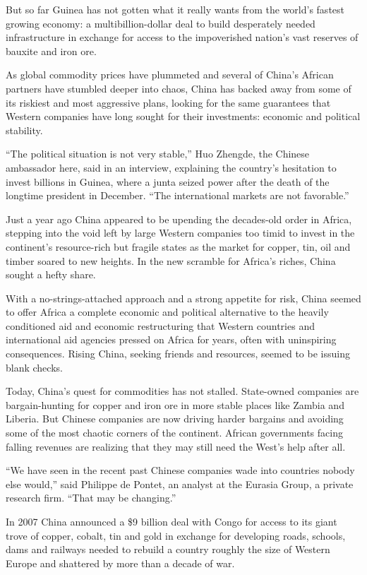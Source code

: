 \documentclass[12pt,a4paper,onecolumn]{article}
\begin{document}
\begin{CJK*}{GBK}{song}
But so far Guinea has not gotten what it really wants from the world's fastest growing economy: a
multibillion-dollar deal to build desperately needed infrastructure in exchange for access to the
impoverished nation's vast reserves of bauxite and iron ore.

As global commodity prices have plummeted and several of China's African partners have stumbled
deeper into chaos, China has backed away from some of its riskiest and most aggressive plans,
looking for the same guarantees that Western companies have long sought for their investments:
economic and political stability.

``The political situation is not very stable,'' Huo Zhengde, the Chinese ambassador here, said in an
interview, explaining the country's hesitation to invest billions in Guinea, where a junta seized
power after the death of the longtime president in December. ``The international markets are not
favorable.''

Just a year ago China appeared to be upending the decades-old order in Africa, stepping into the
void left by large Western companies too timid to invest in the continent's resource-rich but
fragile states as the market for copper, tin, oil and timber soared to new heights. In the new
scramble for Africa's riches, China sought a hefty share.

With a no-strings-attached approach and a strong appetite for risk, China seemed to offer Africa a
complete economic and political alternative to the heavily conditioned aid and economic
restructuring that Western countries and international aid agencies pressed on Africa for years,
often with uninspiring consequences. Rising China, seeking friends and resources, seemed to be
issuing blank checks.

Today, China's quest for commodities has not stalled. State-owned companies are bargain-hunting for
copper and iron ore in more stable places like Zambia and Liberia. But Chinese companies are now
driving harder bargains and avoiding some of the most chaotic corners of the continent. African
governments facing falling revenues are realizing that they may still need the West's help after
all.

``We have seen in the recent past Chinese companies wade into countries nobody else would,'' said
Philippe de Pontet, an analyst at the Eurasia Group, a private research firm. ``That may be
changing.''

In 2007 China announced a \$9 billion deal with Congo for access to its giant trove of copper,
cobalt, tin and gold in exchange for developing roads, schools, dams and railways needed to rebuild
a country roughly the size of Western Europe and shattered by more than a decade of war.


\end{CJK*}
\end{document}
